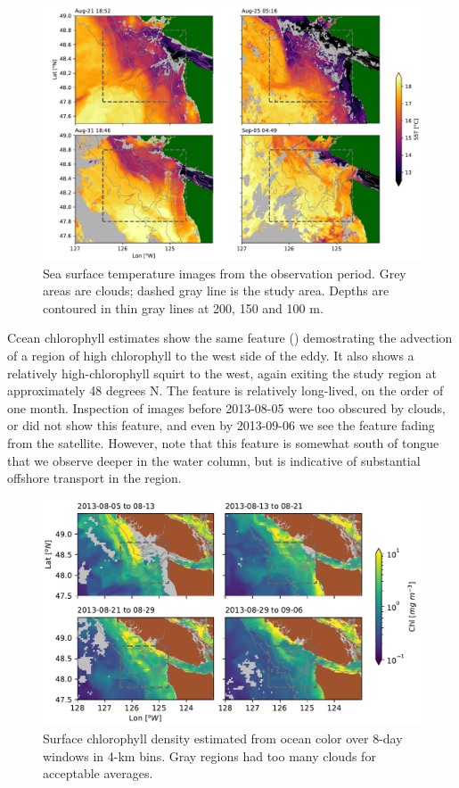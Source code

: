 \documentclass[draft]{agujournal2019}
\begin{document}
\begin{figure}
  \begin{center}
    \includegraphics[width=6in]{SSTSnaps}
    \caption{Sea surface temperature images from the observation period.  Grey areas are clouds; dashed gray line is the study area. Depths are contoured in thin gray lines at 200, 150 and 100 m. \cite{L2PMetopA}\label{fig:SST}}
  \end{center}
\end{figure}

Ccean chlorophyll estimates show the same feature () demostrating the advection of a region of high chlorophyll to the west side of the eddy. It also shows a relatively high-chlorophyll squirt to the west, again exiting the study region at approximately 48 degrees N.  The feature is relatively long-lived, on the order of one month.  Inspection of images before 2013-08-05 were too obscured by clouds, or did not show this feature, and even by 2013-09-06 we see the feature fading from the satellite.  However, note that this feature is somewhat south of tongue that we observe deeper in the water column, but is indicative of substantial offshore transport in the region.

\begin{figure}[htbp]
  \begin{center}
    \includegraphics[width=6.2in]{ChlA}
    \caption{Surface chlorophyll density estimated from ocean color \cite{Huetal12,MODISChlL3} over 8-day windows in 4-km bins. Gray regions had too many clouds for acceptable averages.
      \label{fig:ChlA} }
  \end{center}
\end{figure}
\end{document}
